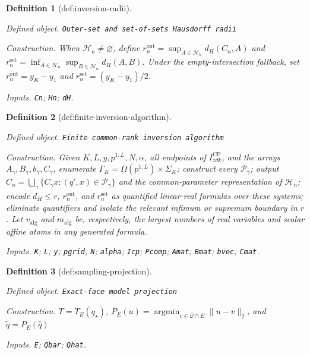 \documentclass{article}
\newtheorem{definition}{Definition}
\begin{document}
\begin{definition}[def:inversion-radii]\label{def:inversion-radii}
\par\smallskip\noindent\emph{Defined object.} \texttt{Outer-\allowbreak{}set and set-\allowbreak{}of-\allowbreak{}sets Hausdorff radii}
\par\smallskip\noindent\emph{Construction.} When \(\mathcal H_n\ne\varnothing\), define \(r_n^{\mathrm{out}}=\sup_{A\in\mathcal H_n}d_H(C_n,A)\) and \(r_n^{\mathrm{set}}=\inf_{A\in\mathcal H_n}\sup_{B\in\mathcal H_n}d_H(A,B)\). Under the empty-intersection fallback, set \(r_n^{\mathrm{out}}=y_K-y_1\) and \(r_n^{\mathrm{set}}=(y_K-y_1)/2\).
\par\smallskip\noindent\emph{Inputs.} \texttt{Cn}; \texttt{Hn}; \texttt{dH}.
\end{definition}

\begin{definition}[def:finite-inversion-algorithm]\label{def:finite-inversion-algorithm}
\par\smallskip\noindent\emph{Defined object.} \texttt{Finite common-\allowbreak{}rank inversion algorithm}
\par\smallskip\noindent\emph{Construction.} Given \(K,L,y,p^{1:L},N,\alpha\), all endpoints of \(I^{\mathrm{CP}}_{zdk}\), and the arrays \(A_\gamma,B_\gamma,b_\gamma,C_\gamma\), enumerate \(\Gamma_K=\Omega(p^{1:L})\times\Sigma_K\); construct every \(\mathcal P_\gamma\); output \(C_n=\bigcup_\gamma\{C_\gamma x:(q',x)\in\mathcal P_\gamma\}\) and the common-parameter representation of \(\mathcal H_n\); encode \(d_H\le r\), \(r_n^{\mathrm{out}}\), and \(r_n^{\mathrm{set}}\) as quantified linear-real formulas over these systems; eliminate quantifiers and isolate the relevant infimum or supremum boundary in \(r\). Let \(v_{\mathrm{alg}}\) and \(m_{\mathrm{alg}}\) be, respectively, the largest numbers of real variables and scalar affine atoms in any generated formula.
\par\smallskip\noindent\emph{Inputs.} \texttt{K}; \texttt{L}; \texttt{y}; \texttt{pgrid}; \texttt{N}; \texttt{alpha}; \texttt{Icp}; \texttt{Pcomp}; \texttt{Amat}; \texttt{Bmat}; \texttt{bvec}; \texttt{Cmat}.
\end{definition}

\begin{definition}[def:sampling-projection]\label{def:sampling-projection}
\par\smallskip\noindent\emph{Defined object.} \texttt{Exact-\allowbreak{}face model projection}
\par\smallskip\noindent\emph{Construction.} \(T=T_E(q_\star)\), \(P_E(u)=\operatorname*{argmin}_{v\in\overline{\mathcal Q}\cap E}\|u-v\|_2\), and \(\widetilde q=P_E(\widehat q)\)
\par\smallskip\noindent\emph{Inputs.} \texttt{E}; \texttt{Qbar}; \texttt{Qhat}.
\end{definition}
\end{document}

